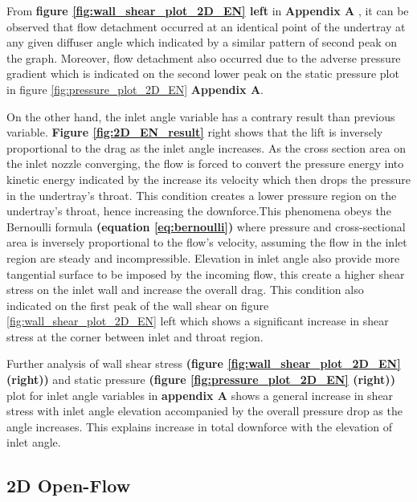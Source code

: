 \noindent From \textbf{figure \ref{fig:wall_shear_plot_2D_EN} left} in \textbf{Appendix A} ,  it can be observed that flow detachment occurred at an identical point of the undertray at any given diffuser angle which indicated by a similar pattern of second peak on the graph. Moreover,  flow detachment also occurred due to the adverse pressure gradient which is indicated on the second lower peak on the static pressure plot in figure \ref{fig:pressure_plot_2D_EN} \textbf{Appendix A}.

\noindent On the other hand, the inlet angle variable has a contrary result than previous variable. \textbf{Figure \ref{fig:2D_EN_result}} right shows that the lift  is inversely proportional to the drag as the inlet angle increases.  As the cross section area on the inlet nozzle converging, the flow is forced to convert the pressure energy into kinetic energy indicated by the increase its velocity which then drops the pressure in the undertray's throat. This condition creates a lower pressure region on the undertray's throat, hence increasing the downforce.This phenomena obeys the Bernoulli formula\textbf{ (equation \ref{eq:bernoulli})} where pressure and cross-sectional area is inversely proportional to the flow's velocity, assuming the flow in the inlet region are steady and incompressible.  Elevation in inlet angle also provide more tangential surface to be imposed by the incoming flow, this create a higher shear stress on the inlet wall and increase the overall drag. This condition also indicated on the first peak of the wall shear on figure \ref{fig:wall_shear_plot_2D_EN} left which shows a significant increase in shear stress at the corner between inlet and throat region.

\noindent Further analysis of wall shear stress \textbf{(figure \ref{fig:wall_shear_plot_2D_EN} (right))} and static pressure \textbf{(figure \ref{fig:pressure_plot_2D_EN} (right))} plot for inlet angle variables in \textbf{appendix A} shows a general increase in shear stress with inlet angle elevation accompanied by the overall pressure drop as the angle increases. This explains increase in total downforce with the elevation of inlet angle.





\subsection{2D Open-Flow}
